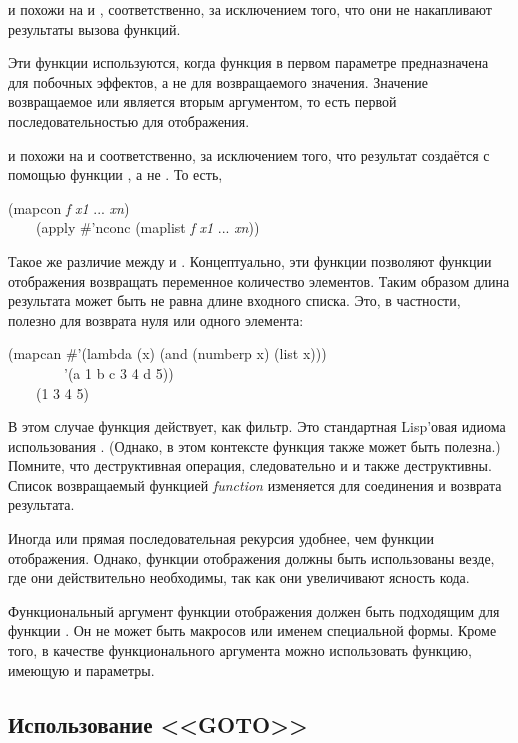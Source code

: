 \begin{defun}[Function]
 и  похожи на  и , соответственно,
за исключением того, что они не накапливают результаты вызова функций.

Эти функции используются, когда функция в первом параметре предназначена для
побочных эффектов, а не для возвращаемого значения.
Значение возвращаемое  или  является вторым аргументом, то
есть первой последовательностью для отображения.

 и  похожи на  и 
соответственно, за исключением того, что результат создаётся с помощью функции
, а не . То есть, 
\begin{lisp}
(mapcon \emph{f} \emph{x1} ... \emph{xn}) \\
~~~\EQ\ (apply \#'nconc (maplist \emph{f} \emph{x1} ... \emph{xn}))
\end{lisp}
Такое же различие между  и .
Концептуально, эти функции позволяют функции отображения возвращать переменное
количество элементов. Таким образом длина результата может быть не равна длине
входного списка.
Это, в частности, полезно для возврата нуля или одного элемента:
\begin{lisp}
(mapcan \#'(lambda (x) (and (numberp x) (list x))) \\
~~~~~~~~'(a 1 b c 3 4 d 5)) \\
~~~\EV\ (1 3 4 5)
\end{lisp}
В этом случае функция действует, как фильтр. Это стандартная Lisp'овая идиома
использования .
(Однако, в этом контексте функция  также может быть полезна.)
Помните, что  деструктивная операция, следовательно и  и
 также деструктивны. Список возвращаемый функцией \emph{function}
изменяется для соединения и возврата результата.

Иногда  или прямая последовательная рекурсия удобнее, чем функции
отображения. Однако, функции отображения должны быть использованы везде, где они
действительно необходимы, так как они увеличивают ясность кода.

Функциональный аргумент функции отображения должен быть подходящим для функции
. Он не может быть макросов или именем специальной формы.
Кроме того, в качестве функционального аргумента можно использовать функцию,
имеющую  и  параметры.
\end{defun}

\subsection{Использование <<GOTO>>}

